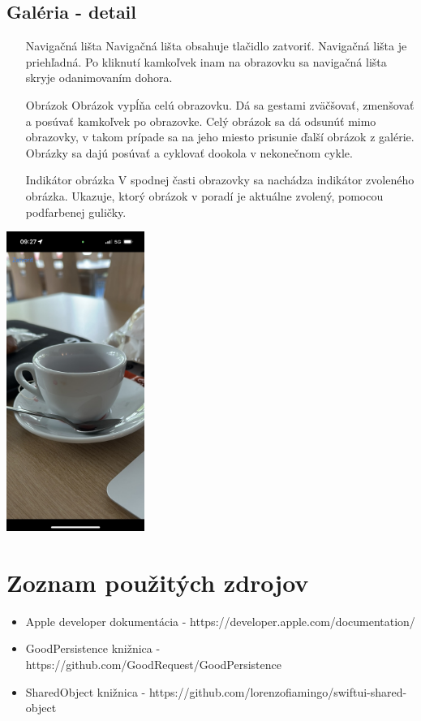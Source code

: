 \documentclass[11pt]{article} %
\begin{document}
\pagebreak
\subsection{Galéria - detail}
\begin{itemize}
\item[Navigačná lišta]{
	Navigačná lišta obsahuje tlačidlo zatvoriť. Navigačná lišta je priehľadná. Po kliknutí kamkoľvek inam na obrazovku sa navigačná lišta skryje odanimovaním dohora.
}
\item[Obrázok]{
	Obrázok vypĺňa celú obrazovku. Dá sa gestami zväčšovať, zmenšovať a posúvať kamkoľvek po obrazovke. Celý obrázok sa dá odsunúť mimo obrazovky, v takom prípade sa na jeho miesto prisunie ďalší obrázok z galérie. Obrázky sa dajú posúvať a cyklovať dookola v nekonečnom cykle.
}
\item[Indikátor obrázka]{
	V spodnej časti obrazovky sa nachádza indikátor zvoleného obrázka. Ukazuje, ktorý obrázok v poradí je aktuálne zvolený, pomocou podfarbenej guličky.
}
\end{itemize}
\begin{center}
\includegraphics[width=4.5cm]{detail.jpeg}
\end{center}

\pagebreak
\section{Zoznam použitých zdrojov}
\begin{itemize}
\item {
	Apple developer dokumentácia - https://developer.apple.com/documentation/
}
\item {
	GoodPersistence knižnica - https://github.com/GoodRequest/GoodPersistence
}
\item {
	SharedObject knižnica - https://github.com/lorenzofiamingo/swiftui-shared-object
}
\end{itemize}
\end{document}
